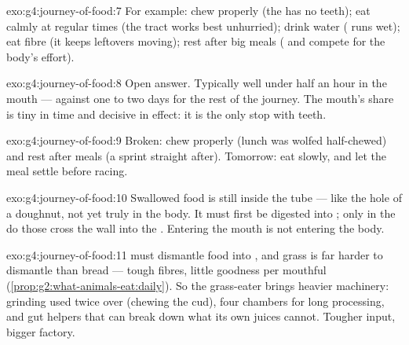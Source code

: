 \begin{solution}{exo:g4:journey-of-food:7}
For example: chew properly (the  has no teeth); eat
calmly at regular times (the tract works best unhurried);
drink water ( runs wet); eat fibre (it keeps
leftovers moving); rest after big meals ( and 
compete for the body's effort).
\end{solution}

\begin{solution}{exo:g4:journey-of-food:8}
Open answer. Typically well under half an hour in the mouth
--- against one to two days for the rest of the journey. The
mouth's share is tiny in time and decisive in effect: it is
the only stop with teeth.
\end{solution}

\begin{solution}{exo:g4:journey-of-food:9}
Broken: chew properly (lunch was wolfed half-chewed) and rest
after meals (a sprint straight after). Tomorrow: eat slowly,
and let the meal settle before racing.
\end{solution}

\begin{solution}{exo:g4:journey-of-food:10}
Swallowed food is still inside the tube --- like the hole of a
doughnut, not yet truly in the body. It must first be digested
into ; only in the  do those cross the
wall into the . Entering the mouth is not entering the
body.
\end{solution}

\begin{solution}{exo:g4:journey-of-food:11}
 must dismantle food into , and grass is far
harder to dismantle than bread --- tough fibres, little
goodness per mouthful
(\cref{prop:g2:what-animals-eat:daily}). So the grass-eater
brings heavier machinery: grinding  used twice over
(chewing the cud), four  chambers for long processing,
and gut helpers that can break down what its own juices
cannot. Tougher input, bigger factory.
\end{solution}
